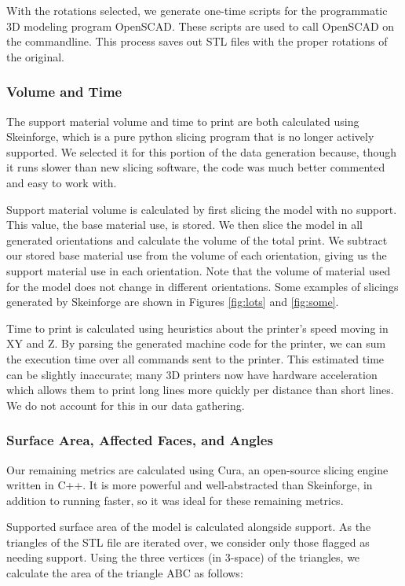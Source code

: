 \documentclass{sigchi}
\begin{document}
With the rotations selected, we generate one-time scripts for the programmatic 3D modeling program OpenSCAD.  These scripts are used to call OpenSCAD on the commandline.  This process saves out STL files with the proper rotations of the original.

\subsubsection{Volume and Time}
The support material volume and time to print are both calculated using Skeinforge, which is a pure python slicing program that is no longer actively supported.  We selected it for this portion of the data generation because, though it runs slower than new slicing software, the code was much better commented and easy to work with.

Support material volume is calculated by first slicing the model with no support.  This value, the base material use, is stored.  We then slice the model in all generated orientations and calculate the volume of the total print.  We subtract our stored base material use from the volume of each orientation, giving us the support material use in each orientation.  Note that the volume of material used for the model does not change in different orientations.  Some examples of slicings generated by Skeinforge are shown in Figures \ref{fig:lots} and \ref{fig:some}.

Time to print is calculated using heuristics about the printer's speed moving in XY and Z.  By parsing the generated machine code for the printer, we can sum the execution time over all commands sent to the printer.  This estimated time can be slightly inaccurate; many 3D printers now have hardware acceleration which allows them to print long lines more quickly per distance than short lines.  We do not account for this in our data gathering.

\subsubsection{Surface Area, Affected Faces, and Angles}
Our remaining metrics are calculated using Cura, an open-source slicing engine written in C++.  It is more powerful and well-abstracted than Skeinforge, in addition to running faster, so it was ideal for these remaining metrics.

Supported surface area of the model is calculated alongside support.  As the triangles of the STL file are iterated over, we consider only those flagged as needing support.  Using the three vertices (in 3-space) of the triangles, we calculate the area of the triangle ABC as follows:
\end{document}
